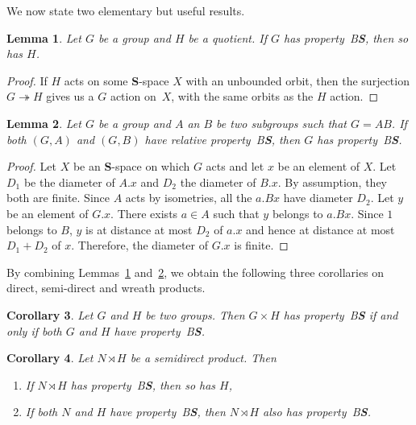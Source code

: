 \documentclass[a4paper]{article}
\newcommand{\PH}[1]{\todo[color={blue!33},size=small]{\textbf{PH :} #1}}
\newtheorem{lem}{Lemma}[section]
\newtheorem{cor}[lem]{Corollary}
\theoremstyle{definition}
\newcommand*{\category}[1]{\textbf{#1}}
\newcommand*{\CatS}{\category{S}}
\newcommand*{\BS}{B\textbf{S}}
\begin{document}
We now state two elementary but useful results.
%
%
\begin{lem}\label{Lemma:Quotient}
Let $G$ be a group and $H$ be a quotient.
If $G$ has property~\BS, then so has $H$.
\end{lem}
\begin{proof}
If $H$ acts on some \CatS-space $X$ with an unbounded orbit, then the surjection $G\twoheadrightarrow H$ gives us a $G$ action on~$X$, with the same orbits as the $H$ action.
\end{proof}
%
%
\begin{lem}\label{Lemma:InterProd}
Let $G$ be a group and $A$ an $B$ be two subgroups such that $G=AB$.
If both $(G,A)$ and $(G,B)$ have relative property~\BS, then $G$ has property~\BS.
\end{lem}
\begin{proof}
Let $X$ be an \CatS-space on which $G$ acts %
and let $x$ be an element of $X$.
Let $D_1$ be the diameter of $A.x$ and $D_2$ the diameter of $B.x$. By assumption, they both are finite.
Since $A$ acts by isometries, all the $a.Bx$ have diameter $D_2$.
Let $y$ be an element of $G.x$. There exists $a\in A$ such that $y$ belongs to $a.Bx$. Since $1$ belongs to $B$, $y$ is at distance at most $D_2$ of $a.x$ and hence at distance at most $D_1+D_2$ of $x$.
Therefore, the diameter of $G.x$ is finite.
\end{proof}
%
%
By combining Lemmas~\ref{Lemma:Quotient} and~\ref{Lemma:InterProd}, we obtain the following three corollaries on direct, semi-direct and wreath products.
%
%
\begin{cor}\label{Cor:Prod}
Let $G$ and $H$ be two groups. Then $G\times H$ has property~\BS{} if and only if both $G$ and $H$ have property~\BS.
\end{cor}
%
%
\begin{cor}\label{Cor:Semidirect}
Let $N\rtimes H$ be a %
semidirect product. Then
\begin{enumerate}
\item
If $N\rtimes H$ has property~\BS, then so has $H$,
\item
If both $N$ and $H$ have property~\BS, then $N\rtimes H$ also has property~\BS.
\end{enumerate}
\end{cor}
\end{document}
